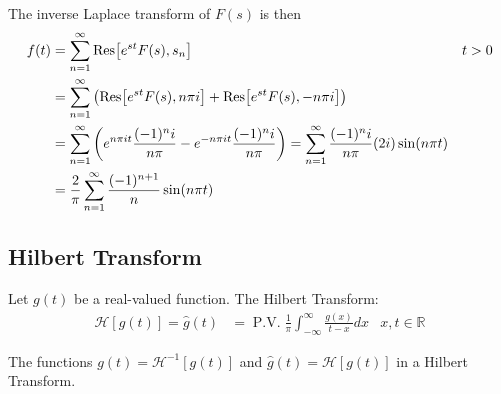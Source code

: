 \documentclass[12pt, english]{book}
\makeatletter
\renewenvironment{proof}[1][\proofname]{\par
	\pushQED{\qed}%
	\normalfont \topsep6\p@\@plus6\p@\relax
	\list{}{%
		\settowidth{\leftmargin}{\itshape\proofname:\hskip\labelsep}%
		\setlength{\labelwidth}{0pt}%
		\setlength{\itemindent}{-\leftmargin}%
	}%
	\item[\hskip\labelsep\itshape#1\@addpunct{:}]\ignorespaces
	}{ \popQED\endlist\@endpefalse}
\makeatother
\begin{document}
\begin{example}
\begin{proof}
{\begin{align*}
			\end{align*}
			The inverse Laplace transform of \(F(s)\) is then
			\begin{align*}
				f(t) 
				&= \sum_{n=1}^{\infty} \Res[e^{st} F(s), s_n]
						& t>0 \\
				&= \sum_{n=1}^{\infty} \left(\Res[e^{st}F(s), n\pi i] + \Res[e^{st}F(s), -n\pi i] \right) \\
				&= \sum_{n=1}^{\infty} \left(e^{n\pi i t} \frac{(-1)^{n} i}{n\pi} - e^{-n\pi i t} \frac{(-1)^{n} i}{n\pi}\right) 
				 = \sum_{n=1}^{\infty} \frac{(-1)^{n} i}{n\pi} (2i) \sin(n\pi t) \\
				&= \frac{2}{\pi} \sum_{n=1}^{\infty} \frac{(-1)^{n+1}}{n} \sin(n\pi t)
			\end{align*}
			}
		\end{proof}
	\end{example}

	\subsection{Hilbert Transform} \label{Hilbert Transform Subsection - Complex}
	
	\begin{definition}
		\label{Hilbert Transform Definition - Complex}
		Let \(g(t)\) be a real-valued function. The Hilbert Transform:
		\begin{align*}
			\mathcal{H}[g(t)] = \hat{g}(t)
			&= \operatorname{P.V.} \frac{1}{\pi}\int_{-\infty}^{\infty} \frac{g(x)}{t-x} dx  
				& x, t \in \mathbb{R}
		\end{align*}
	\end{definition}

	\begin{definition}
		\label{Hilbert Transform Pairs Definition - Complex}
		The functions \(g(t) = \mathcal{H}^{-1}[g(t)]\) and \(\hat{g}(t) = \mathcal{H}[g(t)]\) in a Hilbert Transform.
	\end{definition}
\end{document}

